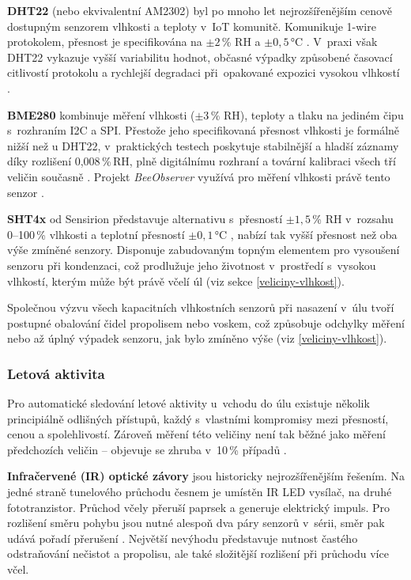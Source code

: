 \textbf{DHT22} (nebo ekvivalentní AM2302) byl po mnoho let nejrozšířenějším cenově dostupným senzorem vlhkosti a teploty v~IoT komunitě. Komunikuje 1-wire protokolem, přesnost je specifikována na $\pm2$\,\% RH a $\pm0{,}5$\,°C \cite{DHT22datasheet}. V~praxi však DHT22 vykazuje vyšší variabilitu hodnot, občasné výpadky způsobené časovací citlivostí protokolu a rychlejší degradaci při~opakované expozici vysokou vlhkostí \cite{zbotic}. 

\textbf{BME280} kombinuje měření vlhkosti ($\pm3$\,\% RH), teploty a tlaku na jediném čipu s~rozhraním I2C a SPI. Přestože jeho specifikovaná přesnost vlhkosti je formálně nižší než u DHT22, v~praktických testech poskytuje stabilnější a hladší záznamy díky rozlišení 0,008\,\%\,RH, plně digitálnímu rozhraní a tovární kalibraci všech tří veličin současně \cite{zbotic}. Projekt \textit{BeeObserver} využívá pro měření vlhkosti právě tento senzor \cite{BeeObserver}.

\textbf{SHT4x} od Sensirion představuje alternativu s~přesností $\pm1{,}5$\,\% RH v~rozsahu 0--100\,\% vlhkosti a teplotní přesností $\pm0{,}1$\,°C \cite{SHT4xdatasheet}, nabízí tak vyšší přesnost než oba výše zmíněné senzory. Disponuje zabudovaným topným elementem pro vysoušení senzoru při kondenzaci, což prodlužuje jeho životnost v~prostředí s~vysokou vlhkostí, kterým může být právě včelí úl (viz sekce \ref{veliciny-vlhkost}).

Společnou výzvu všech kapacitních vlhkostních senzorů při nasazení v~úlu tvoří postupné obalování čidel propolisem nebo voskem, což způsobuje odchylky měření nebo až úplný výpadek senzoru, jak bylo zmíněno výše (viz \ref{veliciny-vlhkost}).

\subsubsection*{Letová aktivita} \label{senzor-let}
Pro automatické sledování letové aktivity u~vchodu do úlu existuje několik principiálně odlišných přístupů, každý s~vlastními kompromisy mezi přesností, cenou a spolehlivostí. Zároveň měření této veličiny není tak běžné jako měření předchozích veličin -- objevuje se zhruba v~10\,\% případů \cite{Sabic2025}.

\textbf{Infračervené (IR) optické závory} jsou historicky nejrozšířenějším řešením. Na jedné straně tunelového průchodu česnem je umístěn IR LED vysílač, na druhé fototranzistor. Průchod včely přeruší paprsek a generuje elektrický impuls. Pro rozlišení směru pohybu jsou nutné alespoň dva páry senzorů v~sérii, směr pak udává pořadí přerušení \cite{pesovic2017}. Největší nevýhodu představuje nutnost častého odstraňování nečistot a propolisu, ale také složitější rozlišení při průchodu více včel.

